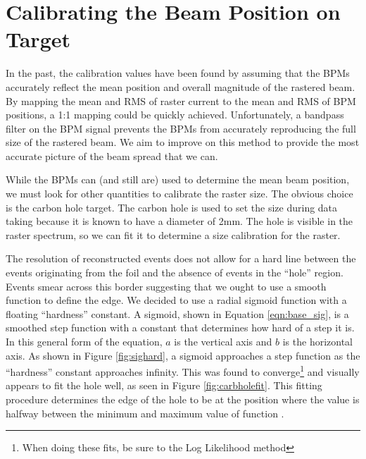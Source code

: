 \section{Calibrating the Beam Position on Target}

In the past, the calibration values have been found by assuming that the BPMs accurately reflect the mean position and overall magnitude of the rastered beam. By mapping the mean and RMS of raster current to the mean and RMS of BPM positions, a 1:1 mapping could be quickly achieved. Unfortunately, a bandpass filter on the BPM signal prevents the BPMs from accurately reproducing the full size of the rastered beam. We aim to improve on this method to provide the most accurate picture of the beam spread that we can.\cite{bpm_slow}


While the BPMs can (and still are) used to determine the mean beam position, we must look for other quantities to calibrate the raster size. The obvious choice is the carbon hole target. The carbon hole is used to set the size during data taking because it is known to have a diameter of 2mm. The hole is visible in the raster spectrum, so we can fit it to determine a size calibration for the raster.

The resolution of reconstructed events does not allow for a hard line between the events originating from the foil and the absence of events in the ``hole'' region. Events smear across this border suggesting that we ought to use a smooth function to define the edge. We decided to use a radial sigmoid function with a floating ``hardness'' constant. A sigmoid, shown in Equation \ref{eqn:base_sig}, is a smoothed step function with a constant that determines how hard of a step it is. In this general form of the equation, $a$ is the vertical axis and $b$ is the horizontal axis. As shown in Figure \ref{fig:sighard}, a sigmoid approaches a step function as the ``hardness'' constant approaches infinity. This was found to converge\footnote{When doing these fits, be sure to the Log Likelihood method} and visually appears to fit the hole well, as seen in Figure \ref{fig:carbholefit}. This fitting procedure determines the edge of the hole to be at the position where the value is halfway between the minimum and maximum value of function \cite{Evan}.

